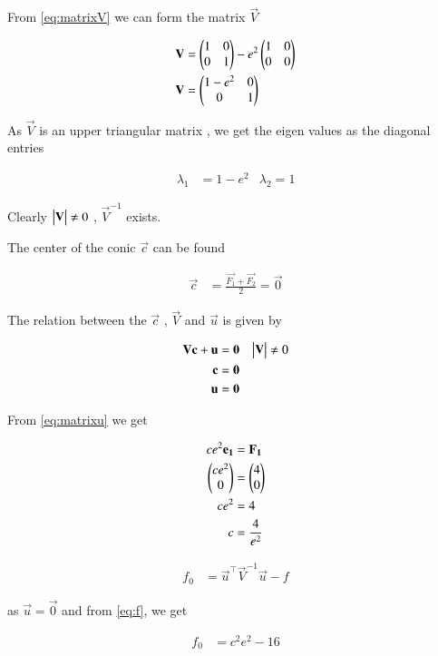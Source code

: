 \documentclass[journal]{IEEEtran}
\begin{document}
From \eqref{eq:matrixV} we can form the matrix $\vec{V}$

\begin{align}
  \mathbf{V} &= \begin{pmatrix}1 & 0\\0 & 1\end{pmatrix} - e^2\begin{pmatrix}1 & 0\\0 & 0\end{pmatrix}\\
  \mathbf{V} &= \begin{pmatrix}1-e^2 & 0\\0 & 1\end{pmatrix}
\end{align}

As $\vec{V}$ is an upper triangular matrix , we get the eigen values as the diagonal entries 

\begin{align}
  \lambda_1 &= 1 - e^2 & \lambda_2 = 1
\end{align}

Clearly $\begin{vmatrix}\mathbf{V}\end{vmatrix} \neq 0$ , $\vec{V}^{-1}$ exists.



The center of the conic $\vec{c}$ can be found 

\begin{align}
  \vec{c} &= \frac{\vec{F_1}+\vec{F_2}}{2} = \vec{0}
\end{align}

The relation between the $\vec{c}$ , $\vec{V}$ and $\vec{u}$ is given by 

\begin{align}
  \mathbf{V}\mathbf{c} + \mathbf{u} &= \mathbf{0} & \begin{vmatrix}\mathbf{V}\end{vmatrix} \neq 0 \\
  \mathbf{c} &= \mathbf{0}\\
  \mathbf{u} &= \mathbf{0}
\end{align}

From \eqref{eq:matrixu} we get 

\begin{align}
  ce^2\mathbf{e_1} &= \mathbf{F_1}\\
  \begin{pmatrix}ce^2\\0\end{pmatrix} &= \begin{pmatrix}4\\0\end{pmatrix}\\
  ce^2 &= 4\\
  c &= \frac{4}{e^2} \label{eq:c}
\end{align}

\begin{align}
  f_0 &= \vec{u}^\top\vec{V}^{-1}\vec{u} - f
\end{align}

as $\vec{u}=\vec{0}$ and from \eqref{eq:f}, we get 

\begin{align}
  f_0 &= c^2e^2 - 16
\end{align}
\end{document}
